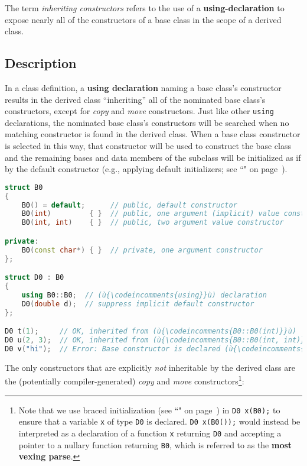

The term \textit{inheriting constructors} refers to the use of a
\textbf{{\ttfamily\bfseries using}-declaration} to expose nearly all of the
constructors of a base class in the scope of a derived class.

\subsection[Description]{Description}\label{description-inheritingctor}

In a class definition, a \textbf{{\ttfamily\bfseries using} declaration} naming a
base class's constructor results in the derived class ``inheriting'' all
of the nominated base class's constructors, except for \emph{copy} and
\emph{move} constructors. Just like other \texttt{using} declarations, the nominated base class's
constructors will be searched when no matching constructor is found in
the derived class. When a base class constructor is selected in this way,
that constructor will be used to construct the base class and the
remaining bases and data members of the subclass will be initialized as
if by the default constructor (e.g., applying default initializers;
see ``" on page~\pageref{Default-Member-Initializers}). 

\begin{lstlisting}[language=C++]
struct B0
{
    B0() = default;      // public, default constructor
    B0(int)         { }  // public, one argument (implicit) value constructor
    B0(int, int)    { }  // public, two argument value constructor

private:
    B0(const char*) { }  // private, one argument constructor
};

struct D0 : B0
{
    using B0::B0;  // (ù{\codeincomments{using}}ù) declaration
    D0(double d);  // suppress implicit default constructor
};

D0 t(1);     // OK, inherited from (ù{\codeincomments{B0::B0(int)}}ù)
D0 u(2, 3);  // OK, inherited from (ù{\codeincomments{B0::B0(int, int)}}ù)
D0 v("hi");  // Error: Base constructor is declared (ù{\codeincomments{private}}ù).
\end{lstlisting}
    
\noindent The only constructors that are explicitly \emph{not} inheritable by the
derived class are the (potentially compiler-generated) \emph{copy} and
\emph{move} constructors{\cprotect\footnote{Note that we use
 braced initialization (see ``" on page~\pageref{bracedinit}) in \texttt{D0}~\texttt{x(B0{});}
  to ensure that a variable \texttt{x} of type \texttt{D0} is declared.
  \texttt{D0}~\texttt{x(B0());} would instead be interpreted as a
  declaration of a function \texttt{x} returning \texttt{D0} and
  accepting a pointer to a nullary function returning \texttt{B0}, which
  is referred to as the \textbf{most vexing parse}.}}:

